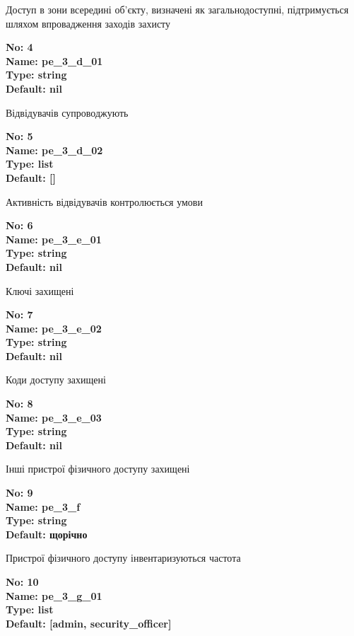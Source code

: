 \documentclass{article}
\begin{document}
{\footnotesize Доступ в зони всередині об'єкту, визначені як загальнодоступні, підтримується шляхом впровадження заходів захисту}


{\footnotesize\bfseries
No: 4\\
Name: pe\_\allowbreak{}3\_\allowbreak{}d\_\allowbreak{}01\\
Type: string\\
Default: nil
}

{\footnotesize Відвідувачів супроводжують}


{\footnotesize\bfseries
No: 5\\
Name: pe\_\allowbreak{}3\_\allowbreak{}d\_\allowbreak{}02\\
Type: list\\
Default: []
}

{\footnotesize Активність відвідувачів контролюється умови}


{\footnotesize\bfseries
No: 6\\
Name: pe\_\allowbreak{}3\_\allowbreak{}e\_\allowbreak{}01\\
Type: string\\
Default: nil
}

{\footnotesize Ключі захищені}


{\footnotesize\bfseries
No: 7\\
Name: pe\_\allowbreak{}3\_\allowbreak{}e\_\allowbreak{}02\\
Type: string\\
Default: nil
}

{\footnotesize Коди доступу захищені}


{\footnotesize\bfseries
No: 8\\
Name: pe\_\allowbreak{}3\_\allowbreak{}e\_\allowbreak{}03\\
Type: string\\
Default: nil
}

{\footnotesize Інші пристрої фізичного доступу захищені}


{\footnotesize\bfseries
No: 9\\
Name: pe\_\allowbreak{}3\_\allowbreak{}f\\
Type: string\\
Default: \textquotedbl{}щорічно\textquotedbl{}
}

{\footnotesize Пристрої фізичного доступу інвентаризуються частота}


{\footnotesize\bfseries
No: 10\\
Name: pe\_\allowbreak{}3\_\allowbreak{}g\_\allowbreak{}01\\
Type: list\\
Default: [\textquotedbl{}admin\textquotedbl{}, \textquotedbl{}security\_\allowbreak{}officer\textquotedbl{}]
}
\end{document}
